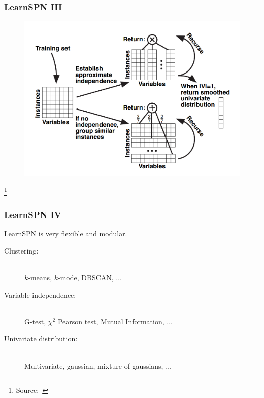 \documentclass{beamer}
\newcommand\blfootnote[1]{%
  \begingroup
  \renewcommand\thefootnote{}\footnote{#1}%
  \addtocounter{footnote}{-1}%
  \endgroup
}
\begin{document}
\begin{frame}
  \frametitle{LearnSPN III}

  \begin{figure}
    \centering\includegraphics[height=0.85\textheight]{imgs/learnspn.png}
  \end{figure}\vspace{-0.5cm}
  \blfootnote{Source:~\cite{gens-domingos}}
\end{frame}

\begin{frame}
  \frametitle{LearnSPN IV}

  LearnSPN is very flexible and modular.

  \begin{description}
    \item[Clustering:]~\\
      $k$-means, $k$-mode, DBSCAN, $\ldots$
    \item[Variable independence:]~\\
      G-test, $\chi^2$ Pearson test, Mutual Information, $\ldots$
    \item[Univariate distribution:]~\\
      Multivariate, gaussian, mixture of gaussians, $\ldots$
  \end{description}
\end{frame}
\end{document}

